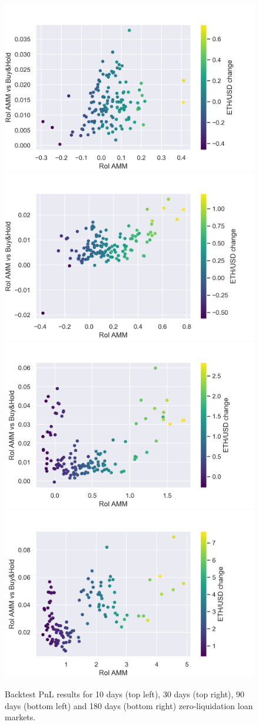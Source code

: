 \documentclass[a4paper]{article}
\begin{document}
\begin{figure}
    \includegraphics[width=.49\textwidth]{figures/simulation_2_dt_10.png}\hfill
    \includegraphics[width=.49\textwidth]{figures/simulation_2_dt_30.png}
    \\[\smallskipamount]
    \includegraphics[width=.49\textwidth]{figures/simulation_2_dt_90.png}\hfill
    \includegraphics[width=.49\textwidth]{figures/simulation_2_dt_180.png}
    \caption{Backtest PnL results for 10 days (top left), 30 days (top right), 90 days (bottom left) and 180 days (bottom right) zero-liquidation loan markets.}\label{fig:backtest_pnl}
\end{figure}
\end{document}
